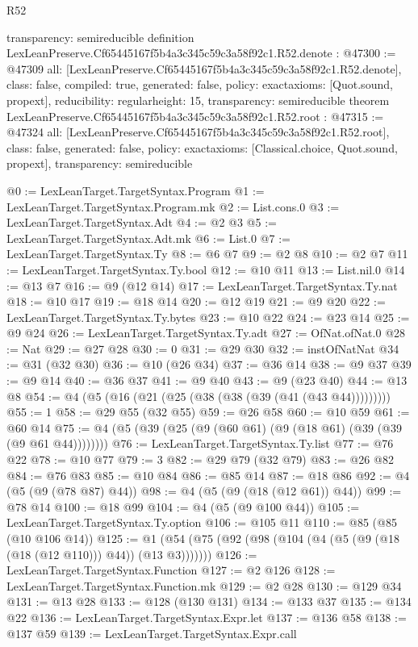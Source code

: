 \begin{lexlean}{R52}
\begin{coremodule}
{  transparency: semireducible
}
definition LexLeanPreserve.Cf65445167f5b4a3c345c59c3a58f92c1.R52.denote : @47300 := @47309 {
  all: [LexLeanPreserve.Cf65445167f5b4a3c345c59c3a58f92c1.R52.denote],
  class: false,
  compiled: true,
  generated: false,
  policy: exact{axioms: [Quot.sound, propext]},
  reducibility: regular{height: 15},
  transparency: semireducible
}
theorem LexLeanPreserve.Cf65445167f5b4a3c345c59c3a58f92c1.R52.root : @47315 := @47324 {
  all: [LexLeanPreserve.Cf65445167f5b4a3c345c59c3a58f92c1.R52.root],
  class: false,
  generated: false,
  policy: exact{axioms: [Classical.choice, Quot.sound, propext]},
  transparency: semireducible
}

@0 := LexLeanTarget.TargetSyntax.Program
@1 := LexLeanTarget.TargetSyntax.Program.mk
@2 := List.cons.{0}
@3 := LexLeanTarget.TargetSyntax.Adt
@4 := @2 @3
@5 := LexLeanTarget.TargetSyntax.Adt.mk
@6 := List.{0}
@7 := LexLeanTarget.TargetSyntax.Ty
@8 := @6 @7
@9 := @2 @8
@10 := @2 @7
@11 := LexLeanTarget.TargetSyntax.Ty.bool
@12 := @10 @11
@13 := List.nil.{0}
@14 := @13 @7
@16 := @9 (@12 @14)
@17 := LexLeanTarget.TargetSyntax.Ty.nat
@18 := @10 @17
@19 := @18 @14
@20 := @12 @19
@21 := @9 @20
@22 := LexLeanTarget.TargetSyntax.Ty.bytes
@23 := @10 @22
@24 := @23 @14
@25 := @9 @24
@26 := LexLeanTarget.TargetSyntax.Ty.adt
@27 := OfNat.ofNat.{0}
@28 := Nat
@29 := @27 @28
@30 := 0
@31 := @29 @30
@32 := instOfNatNat
@34 := @31 (@32 @30)
@36 := @10 (@26 @34)
@37 := @36 @14
@38 := @9 @37
@39 := @9 @14
@40 := @36 @37
@41 := @9 @40
@43 := @9 (@23 @40)
@44 := @13 @8
@54 := @4 (@5 (@16 (@21 (@25 (@38 (@38 (@39 (@41 (@43 @44)))))))))
@55 := 1
@58 := @29 @55 (@32 @55)
@59 := @26 @58
@60 := @10 @59
@61 := @60 @14
@75 := @4 (@5 (@39 (@25 (@9 (@60 @61) (@9 (@18 @61) (@39 (@39 (@9 @61 @44))))))))
@76 := LexLeanTarget.TargetSyntax.Ty.list
@77 := @76 @22
@78 := @10 @77
@79 := 3
@82 := @29 @79 (@32 @79)
@83 := @26 @82
@84 := @76 @83
@85 := @10 @84
@86 := @85 @14
@87 := @18 @86
@92 := @4 (@5 (@9 (@78 @87) @44))
@98 := @4 (@5 (@9 (@18 (@12 @61)) @44))
@99 := @78 @14
@100 := @18 @99
@104 := @4 (@5 (@9 @100 @44))
@105 := LexLeanTarget.TargetSyntax.Ty.option
@106 := @105 @11
@110 := @85 (@85 (@10 @106 @14))
@125 := @1 (@54 (@75 (@92 (@98 (@104 (@4 (@5 (@9 (@18 (@18 (@12 @110))) @44)) (@13 @3)))))))
@126 := LexLeanTarget.TargetSyntax.Function
@127 := @2 @126
@128 := LexLeanTarget.TargetSyntax.Function.mk
@129 := @2 @28
@130 := @129 @34
@131 := @13 @28
@133 := @128 (@130 @131)
@134 := @133 @37
@135 := @134 @22
@136 := LexLeanTarget.TargetSyntax.Expr.let
@137 := @136 @58
@138 := @137 @59
@139 := LexLeanTarget.TargetSyntax.Expr.call

\end{coremodule}
\end{lexlean}
